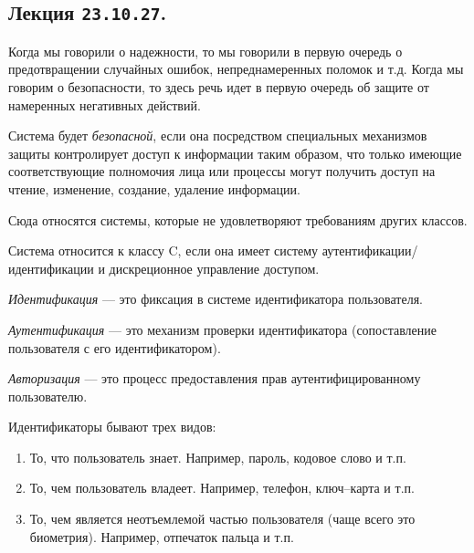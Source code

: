 \subsection{%
  Лекция \texttt{23.10.27}.%
}


Когда мы говорили о надежности, то мы говорили в первую очередь о предотвращении
случайных ошибок, непреднамеренных поломок и т.д. Когда мы говорим о
безопасности, то здесь речь идет в первую очередь об защите от намеренных
негативных действий.

\begin{definition}
  Система будет \textit{безопасной}, если она посредством специальных механизмов защиты
  контролирует доступ к информации таким образом, что только имеющие
  соответствующие полномочия лица или процессы могут получить доступ на чтение,
  изменение, создание, удаление информации.
\end{definition}



Сюда относятся системы, которые не удовлетворяют требованиям других классов.


Система относится к классу C, если она имеет систему
аутентификации/идентификации и дискреционное управление доступом.

\begin{definition}
  \textit{Идентификация} --- это фиксация в системе идентификатора пользователя.
\end{definition}

\begin{definition}
  \textit{Аутентификация} --- это механизм проверки идентификатора (сопоставление
  пользователя с его идентификатором).
\end{definition}

\begin{definition}
  \textit{Авторизация} --- это процесс предоставления прав 
  аутентифицированному пользователю.
\end{definition}

Идентификаторы бывают трех видов:
\begin{enumerate}
\item
  То, что пользователь знает. Например, пароль, кодовое слово и т.п.

\item
  То, чем пользователь владеет. Например, телефон, ключ--карта и т.п.

\item
  То, чем является неотъемлемой частью пользователя (чаще всего это биометрия).
  Например, отпечаток пальца и т.п.
\end{enumerate}

